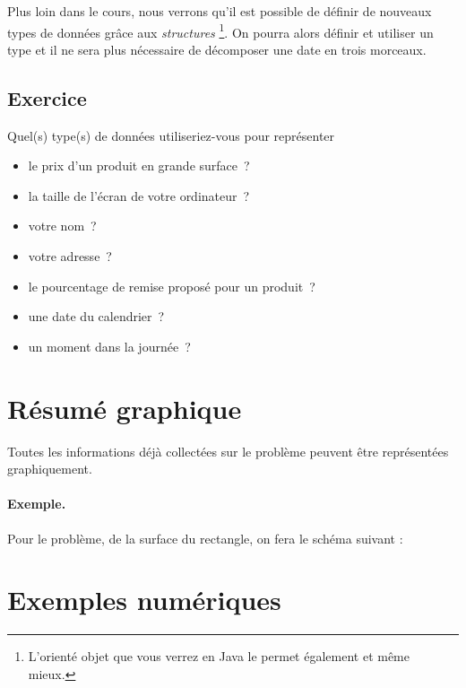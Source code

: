 			Plus loin dans le cours,
			nous verrons qu'il est possible de définir de nouveaux
			types de données grâce aux \emph{structures}%
			\footnote{
				L'orienté objet que vous verrez en Java
				le permet également et même mieux.%
			}. 
			On pourra alors définir et utiliser un type 
			et il ne sera plus nécessaire de décomposer une date en trois
			morceaux.
	
		\subsection{Exercice}
		
			Quel(s) type(s) de données utiliseriez-vous pour représenter 
			\begin{itemize}
				\item le prix d’un produit en grande surface~?
				\item la taille de l'écran de votre ordinateur~?
				\item votre nom~?
				\item votre adresse~?
				\item le pourcentage de remise proposé pour un produit~?
				\item une date du calendrier~?
				\item un moment dans la journée~?
			\end{itemize}
			
	\section{Résumé graphique}
	
		Toutes les informations déjà collectées sur le problème
		peuvent être représentées graphiquement.
	
		\begin{Emphase}
			\paragraph{Exemple.}
			Pour le problème, de la surface du rectangle, 
			on fera le schéma suivant :
			
			\center{}	
		\end{Emphase}
		
	\section{Exemples numériques}
	
